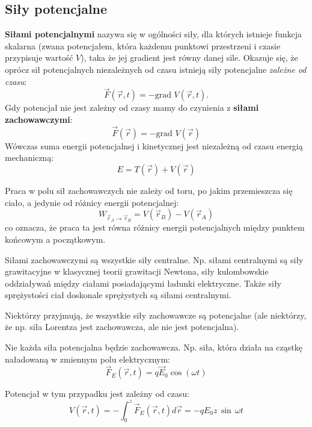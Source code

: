 \documentclass{article}
\begin{document}
\subsection{Siły potencjalne}
\textbf{Siłami potencjalnymi} nazywa się w ogólności siły, dla których istnieje funkcja skalarna (zwana potencjałem, która każdemu punktowi przestrzeni i czasie przypisuje wartość $V$), taka że jej gradient jest równy danej sile. Okazuje się, że oprócz sił potencjalnych niezależnych od czasu istnieją siły potencjalne \textit{zależne od czasu}:
\begin{equation*}
    \vec F(\vec r,t) = -\text{grad}\,\,V(\vec r,t).
\end{equation*}
Gdy potencjał nie jest zależny od czasy mamy do czynienia z \textbf{siłami zachowawczymi}:
\begin{equation*}
    \vec F(\vec r) = -\text{grad}\,\,V(\vec r)
\end{equation*}
Wówczas suma energii potencjalnej i kinetycznej jest niezależną od czasu energią mechaniczną:
\begin{equation*}
    E=T(\vec r)+V(\vec r)
\end{equation*}

Praca w polu sił zachowawczych nie zależy od toru, po jakim przemieszcza się ciało, a jedynie od różnicy energii potencjalnej:
\begin{equation*}
    W_{\vec r_A\to \vec r_B} = V(\vec r_B)-V(\vec r_A)
\end{equation*}
co oznacza, że praca ta jest równa różnicy energii potencjalnych między punktem końcowym a początkowym.

Siłami zachowawczymi są wszystkie siły centralne. Np. siłami centralnymi są siły grawitacyjne w klasycznej teorii grawitacji Newtona, siły kulombowskie oddziaływań między ciałami posiadającymi ładunki elektryczne. Także siły sprężystości ciał doskonale sprężystych są siłami centralnymi.

Niektórzy przyjmują, że wszystkie siły zachowawcze są potencjalne (ale niektórzy, że np. siła Lorentza jest zachowawcza, ale nie jest potencjalna).

Nie każda siła potencjalna będzie zachowawcza. Np. siła, która działa na cząstkę naładowaną w zmiennym polu elektrycznym:
\begin{equation*}
    \vec F_E(\vec r,t) = q \vec E_0 \cos(\omega t)
\end{equation*}

Potencjał w tym przypadku jest zależny od czasu:
\begin{equation*}
    V(\vec r,t)= -\int_0^z \vec F_E(\vec r,t) d\vec r
= -q E_0 z\, \sin\, \omega t
\end{equation*}
\end{document}
